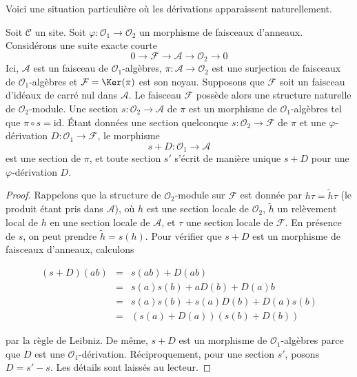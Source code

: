 \noindent
Voici une situation particulière où les dérivations apparaissent naturellement.

\begin{lemma}

\label{lemma-double-structure-gives-derivation}

Soit $\mathcal{C}$ un site. Soit
$\varphi : \mathcal{O}_1 \to \mathcal{O}_2$ un morphisme de faisceaux
d'anneaux. Considérons une suite exacte courte
$$
0 \to \mathcal{F} \to \mathcal{A} \to \mathcal{O}_2 \to 0
$$
Ici, $\mathcal{A}$ est un faisceau de $\mathcal{O}_1$-algèbres,
$\pi : \mathcal{A} \to \mathcal{O}_2$ est une surjection de faisceaux de
$\mathcal{O}_1$-algèbres et $\mathcal{F} = \Ker(\pi)$ est son noyau.
Supposons que $\mathcal{F}$ soit un faisceau d'idéaux de carré nul dans
$\mathcal{A}$. Le faisceau $\mathcal{F}$ possède alors une structure naturelle de
$\mathcal{O}_2$-module. Une section $s : \mathcal{O}_2 \to \mathcal{A}$ de
$\pi$ est un morphisme de $\mathcal{O}_1$-algèbres tel que
$\pi \circ s = \text{id}$. Étant données une section quelconque
$s : \mathcal{O}_2 \to \mathcal{F}$ de $\pi$ et une $\varphi$-dérivation
$D : \mathcal{O}_1 \to \mathcal{F}$, le morphisme
$$
s + D : \mathcal{O}_1 \to \mathcal{A}
$$
est une section de $\pi$, et toute section $s'$ s'écrit de manière unique
$s + D$ pour une $\varphi$-dérivation $D$.

\end{lemma}

\begin{proof}

Rappelons que la structure de $\mathcal{O}_2$-module sur $\mathcal{F}$ est
donnée par $h \tau = \tilde h \tau$ (le produit étant pris dans
$\mathcal{A}$), où $h$ est une section locale de $\mathcal{O}_2$,
$\tilde h$ un relèvement local de $h$ en une section locale de $\mathcal{A}$,
et $\tau$ une section locale de $\mathcal{F}$. En présence de $s$, on peut
prendre $\tilde h = s(h)$. Pour vérifier que $s + D$ est un morphisme de
faisceaux d'anneaux, calculons

\begin{eqnarray*}
(s + D)(ab) & = & s(ab) + D(ab) \\
& = & s(a)s(b) + aD(b) + D(a)b \\
& = & s(a) s(b) + s(a)D(b) + D(a)s(b) \\
& = & (s(a) + D(a))(s(b) + D(b))
\end{eqnarray*}

par la règle de Leibniz. De même, $s + D$ est un morphisme de
$\mathcal{O}_1$-algèbres parce que $D$ est une $\mathcal{O}_1$-dérivation.
Réciproquement, pour une section $s'$, posons $D = s' - s$. Les détails sont
laissés au lecteur.

\end{proof}

